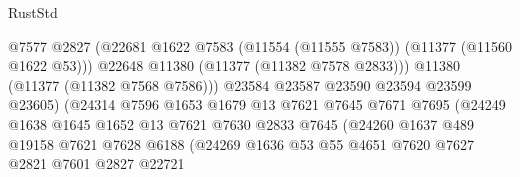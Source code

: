 \begin{lexlean}{RustStd}
\begin{coremodule}
                                          @7577
                                          @2827
                                          (@22681
                                            @1622
                                            @7583
                                            (@11554 (@11555 @7583))
                                            (@11377 (@11560 @1622 @53)))
                                          @22648
                                          @11380
                                          (@11377 (@11382 @7578 @2833)))
                                        @11380
                                        (@11377 (@11382 @7568 @7586)))
                                      @23584
                                      @23587
                                      @23590
                                      @23594
                                      @23599
                                      @23605)
                                    (@24314
                                      @7596
                                      @1653
                                      @1679
                                      @13
                                      @7621
                                      @7645
                                      @7671
                                      @7695
                                      (@24249
                                        @1638
                                        @1645
                                        @1652
                                        @13
                                        @7621
                                        @7630
                                        @2833
                                        @7645
                                        (@24260
                                          @1637
                                          @489
                                          @19158
                                          @7621
                                          @7628
                                          @6188
                                          (@24269
                                            @1636
                                            @53
                                            @55
                                            @4651
                                            @7620
                                            @7627
                                            @2821
                                            @7601
                                            @2827
                                            @22721

\end{coremodule}
\end{lexlean}
